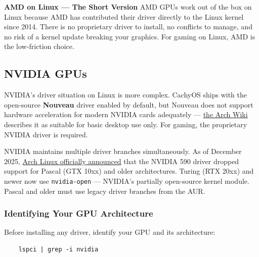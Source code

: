 \documentclass{article}
\newcommand{\code}[1]{\colorbox{codebg}{\texttt{#1}}}
\begin{document}
\begin{callout}{\textbf{AMD on Linux --- The Short Version}}
	AMD GPUs work out of the box on Linux because AMD has contributed their driver
	directly to the Linux kernel since 2014. There is no proprietary driver to
	install, no conflicts to manage, and no risk of a kernel update breaking your
	graphics. For gaming on Linux, AMD is the low-friction choice.
\end{callout}

\subsection{NVIDIA GPUs}

NVIDIA's driver situation on Linux is more complex. CachyOS ships with the
open-source \textbf{Nouveau} driver enabled by default, but Nouveau does not
support hardware acceleration for modern NVIDIA cards adequately ---
\href{https://wiki.archlinux.org/title/Nouveau}{the Arch Wiki} describes it as
suitable for basic desktop use only. For gaming, the proprietary NVIDIA driver
is required.

\begin{tcolorbox}[arc=12pt, outer arc=10pt,
	colback=blue!4!white, colframe=blue!40!black,
	title=\textbf{NVIDIA Driver Landscape (2025--2026)}]
	NVIDIA maintains multiple driver branches simultaneously. As of December 2025,
	\href{https://archlinux.org/news/nvidia-590-driver-drops-pascal-support-main-packages-switch-to-open-kernel-modules/}{Arch
		Linux officially announced} that the NVIDIA 590 driver dropped support for Pascal
	(GTX 10xx) and older architectures. Turing (RTX 20xx) and newer now use
	\code{nvidia-open} --- NVIDIA's partially open-source kernel module. Pascal and
	older must use legacy driver branches from the AUR.
\end{tcolorbox}

\subsubsection{Identifying Your GPU Architecture}

Before installing any driver, identify your GPU and its architecture:

\begin{verbatim}
	lspci | grep -i nvidia
\end{verbatim}
\end{document}
